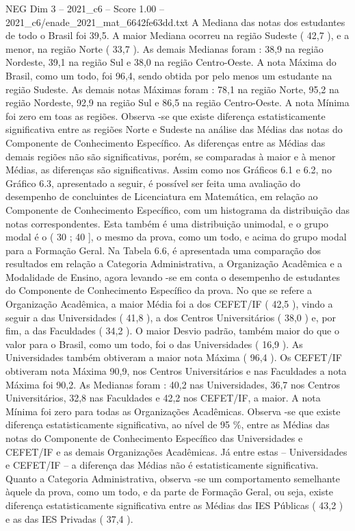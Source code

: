 \begin{textsample}{NEG Dim 3 – 2021\_c6 – Score 1.00 – 2021\_c6/enade\_2021\_mat\_6642fe63dd.txt}
A Mediana das notas dos estudantes de todo o Brasil foi 39,5.
A maior Mediana ocorreu na região Sudeste ( 42,7 ), e a menor, na região Norte ( 33,7 ).
As demais Medianas foram : 38,9 na região Nordeste, 39,1 na região Sul e 38,0 na região Centro-Oeste.
A nota Máxima do Brasil, como um todo, foi 96,4, sendo obtida por pelo menos um estudante na região Sudeste.
As demais notas Máximas foram : 78,1 na região Norte, 95,2 na região Nordeste, 92,9 na região Sul e 86,5 na região Centro-Oeste.
A nota Mínima foi zero em toas as regiões.
Observa -se que existe diferença estatisticamente significativa entre as regiões Norte e Sudeste na análise das Médias das notas do Componente de Conhecimento Específico.
As diferenças entre as Médias das demais regiões não são significativas, porém, se comparadas à maior e à menor Médias, as diferenças são significativas.
Assim como nos Gráficos 6.1 e 6.2, no Gráfico 6.3, apresentado a seguir, é possível ser feita uma avaliação do desempenho de concluintes de Licenciatura em Matemática, em relação ao Componente de Conhecimento Específico, com um histograma da distribuição das notas correspondentes.
Esta também é uma distribuição unimodal, e o grupo modal é o ( 30 ; 40 ], o mesmo da prova, como um todo, e acima do grupo modal para a Formação Geral.
Na Tabela 6.6, é apresentada uma comparação dos resultados em relação a Categoria Administrativa, a Organização Acadêmica e a Modalidade de Ensino, agora levando -se em conta o desempenho de estudantes do Componente de Conhecimento Específico da prova.
No que se refere a Organização Acadêmica, a maior Média foi a dos CEFET/IF ( 42,5 ), vindo a seguir a das Universidades ( 41,8 ), a dos Centros Universitários ( 38,0 ) e, por fim, a das Faculdades ( 34,2 ).
O maior Desvio padrão, também maior do que o valor para o Brasil, como um todo, foi o das Universidades ( 16,9 ).
As Universidades também obtiveram a maior nota Máxima ( 96,4 ).
Os CEFET/IF obtiveram nota Máxima 90,9, nos Centros Universitários e nas Faculdades a nota Máxima foi 90,2.
As Medianas foram : 40,2 nas Universidades, 36,7 nos Centros Universitários, 32,8 nas Faculdades e 42,2 nos CEFET/IF, a maior.
A nota Mínima foi zero para todas as Organizações Acadêmicas.
Observa -se que existe diferença estatisticamente significativa, ao nível de 95 \%, entre as Médias das notas do Componente de Conhecimento Específico das Universidades e CEFET/IF e as demais Organizações Acadêmicas.
Já entre estas – Universidades e CEFET/IF – a diferença das Médias não é estatisticamente significativa.
Quanto a Categoria Administrativa, observa -se um comportamento semelhante àquele da prova, como um todo, e da parte de Formação Geral, ou seja, existe diferença estatisticamente significativa entre as Médias das IES Públicas ( 43,2 ) e as das IES Privadas ( 37,4 ).

\end{textsample}
